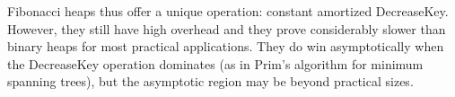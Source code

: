 \documentclass[11pt]{article}
\begin{document}
Fibonacci heaps thus offer a unique operation: constant amortized DecreaseKey.
However, they still have high overhead and they prove considerably slower than
binary heaps for most practical applications.  They do win asymptotically
when the DecreaseKey operation dominates (as in Prim's algorithm for minimum
spanning trees), but the asymptotic region may be beyond practical sizes.
\end{document}
